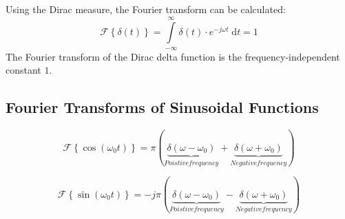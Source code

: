 \begin{refsection}
Using the Dirac measure, the Fourier transform can be calculated:
\begin{equation}
	\mathcal{F} \left\{\delta(t)\right\} = \int\limits_{-\infty}^{\infty} \delta(t) \cdot e^{-j \omega t} \; \mathrm{d} t = 1
\end{equation}
The Fourier transform of the Dirac delta function is the frequency-independent constant $1$.

\subsection{Fourier Transforms of Sinusoidal Functions}

\begin{equation}
	\mathcal{F} \left\{\cos\left(\omega_0 t\right)\right\} = \pi \left( \underbrace{\delta\left(\omega - \omega_0\right)}_{Poistive frequency} + \underbrace{\delta\left(\omega + \omega_0\right)}_{Negative frequency} \right)
\end{equation}

\begin{equation}
	\mathcal{F} \left\{\sin\left(\omega_0 t\right)\right\} = -j \pi \left( \underbrace{\delta\left(\omega - \omega_0\right)}_{Poistive frequency} - \underbrace{\delta\left(\omega + \omega_0\right)}_{Negative frequency} \right)
\end{equation}


\end{refsection}
